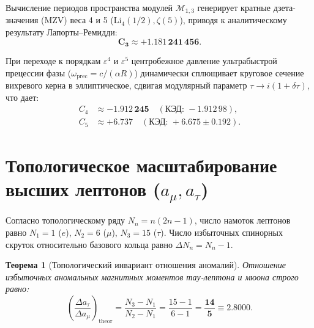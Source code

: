 \documentclass[12pt,a4paper]{article}
\newtheorem{theorem}{Теорема}
\begin{document}
	Вычисление периодов пространства модулей $\mathcal{M}_{1,3}$ генерирует кратные дзета-значения (MZV) веса 4 и 5 ($\mathrm{Li}_4(1/2), \zeta(5)$), приводя к аналитическому результату Лапорты--Ремидди:
	\begin{equation}
		\mathbf{C_3 \approx +1.181\,241\,456}.
	\end{equation}
	
	При переходе к порядкам $\varepsilon^4$ и $\varepsilon^5$ центробежное давление ультрабыстрой прецессии фазы ($\omega_{\text{prec}} = c/(\alpha R)$) динамически сплющивает круговое сечение вихревого керна в эллиптическое, сдвигая модулярный параметр $\tau \to i(1 + \delta\tau)$, что дает:
	\begin{align}
		C_4 &\approx \mathbf{-1.912\,245} \quad (\text{КЭД: } -1.912\,98), \\
		C_5 &\approx \mathbf{+6.737} \quad (\text{КЭД: } +6.675 \pm 0.192).
	\end{align}
	
	\section{Топологическое масштабирование высших лептонов ($a_\mu, a_\tau$)}
	
	Согласно топологическому ряду $N_n = n(2n-1)$, число намоток лептонов равно $N_1 = 1$ ($e$), $N_2 = 6$ ($\mu$), $N_3 = 15$ ($\tau$). Число избыточных спинорных скруток относительно базового кольца равно $\Delta N_n = N_n - 1$.
	
	\begin{theorem}[Топологический инвариант отношения аномалий]
		Отношение избыточных аномальных магнитных моментов тау-лептона и мюона строго равно:
		\begin{equation}
			\left( \frac{\Delta a_\tau}{\Delta a_\mu} \right)_{\mathrm{theor}} = \frac{N_3 - N_1}{N_2 - N_1} = \frac{15 - 1}{6 - 1} = \mathbf{\frac{14}{5} \equiv 2.8000}.
		\end{equation}
	\end{theorem}
	
\end{document}
